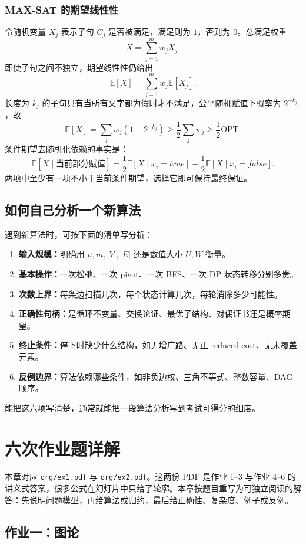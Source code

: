 \documentclass[UTF8,openany,12pt]{ctexbook}
\theoremstyle{remark}
\newcommand{\OPT}{\mathrm{OPT}}
\begin{document}
\subsection{MAX-SAT 的期望线性性}
令随机变量 $X_j$ 表示子句 $C_j$ 是否被满足，满足则为 $1$，否则为 $0$。总满足权重
\[
X=\sum_{j=1}^m w_jX_j.
\]
即使子句之间不独立，期望线性性仍给出
\[
\mathbb E[X]=\sum_{j=1}^m w_j\mathbb E[X_j].
\]
长度为 $k_j$ 的子句只有当所有文字都为假时才不满足，公平随机赋值下概率为 $2^{-k_j}$，故
\[
\mathbb E[X]=\sum_j w_j(1-2^{-k_j})\ge \frac12\sum_jw_j\ge \frac12\OPT.
\]
条件期望去随机化依赖的事实是：
\[
\mathbb E[X\mid \text{当前部分赋值}]
=\frac12\mathbb E[X\mid x_i=true]+\frac12\mathbb E[X\mid x_i=false].
\]
两项中至少有一项不小于当前条件期望，选择它即可保持最终保证。

\section{如何自己分析一个新算法}
遇到新算法时，可按下面的清单写分析：
\begin{enumerate}
  \item \textbf{输入规模：}明确用 $n,m,|V|,|E|$ 还是数值大小 $U,W$ 衡量。
  \item \textbf{基本操作：}一次松弛、一次 pivot、一次 BFS、一次 DP 状态转移分别多贵。
  \item \textbf{次数上界：}每条边扫描几次，每个状态计算几次，每轮消除多少可能性。
  \item \textbf{正确性句柄：}是循环不变量、交换论证、最优子结构、对偶证书还是概率期望。
  \item \textbf{终止条件：}停下时缺少什么结构，如无增广路、无正 reduced cost、无未覆盖元素。
  \item \textbf{反例边界：}算法依赖哪些条件，如非负边权、三角不等式、整数容量、DAG 顺序。
\end{enumerate}
能把这六项写清楚，通常就能把一段算法分析写到考试可得分的细度。

\chapter{六次作业题详解}

本章对应 \texttt{org/ex1.pdf} 与 \texttt{org/ex2.pdf}。这两份 PDF 是作业 1--3
与作业 4--6 的讲义式答案，很多公式在幻灯片中只给了轮廓。本章按题目重写为可独立阅读的解答：先说明问题模型，再给算法或归约，最后给正确性、复杂度、例子或反例。

\section{作业一：图论}
\end{document}
